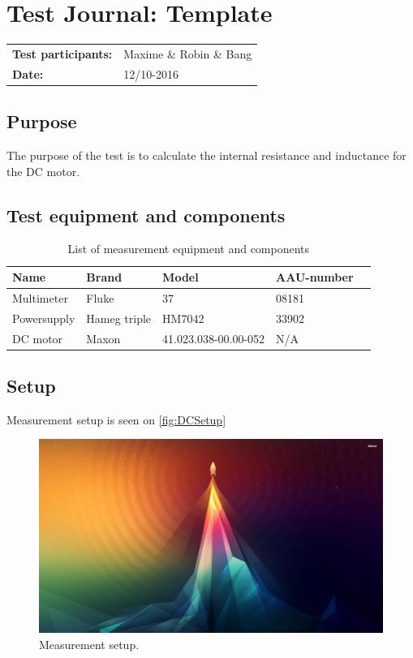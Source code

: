 \graphicspath{{figures/design/}}
\chapter{Test Journal: Template}
\begin{table}[!h]
\begin{tabular}{l l}
\textbf{Test participants:} & Maxime \& Robin \& Bang  \\
\textbf{Date:}  & 12/10-2016
\end{tabular}
\end{table}

\section*{Purpose}
The purpose of the test is to calculate the internal resistance and inductance for the DC motor.
\section*{Test equipment and components}
\begin{table}[h]
	\centering
	\caption{List of measurement equipment and components}\label{tab_appendix:template}

	\begin{tabularx}{\textwidth}{lXXXX}
		Name 				& Brand	& Model & AAU-number									\\ \toprule \rowcolor{lightGrey}
		Multimeter	& Fluke & 37 & 08181 	\\
		Powersupply	& Hameg triple & HM7042 & 33902\\ \rowcolor{lightGrey}
		DC motor & Maxon & 41.023.038-00.00-052& N/A
	\end{tabularx}
\end{table}
\section*{Setup}
Measurement setup is seen on \autoref{fig:DCSetup} \
\begin{figure} [h]
\centering
\includegraphics[width=0.6\linewidth]{figures/frontpage.jpg}
\caption{Measurement setup.}
\label{fig:DCSetup}
\end{figure}

